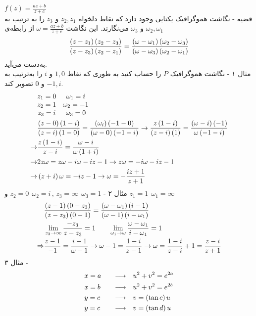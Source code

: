 $f(z)=\frac{az+b}{z+c}$\\
قضیه - نگاشت هموگرافیک یکتایی وجود دارد که نقاط دلخواه
$z_2,z_1$
و
$z_3$
را به ترتیب به
$\omega_2,\omega_1$
و
$\omega_3$
می‌نگارند. این نگاشت
$\omega=\frac{az+b}{z+c}$
از رابطه‌ی
\[
\frac{\left(z-z_1\right)\left(z_2-z_3\right)}{\left(z-z_3\right)\left(z_2-z_1\right)}=
\frac{\left(\omega-\omega_1\right)\left(\omega_2-\omega_3\right)}{\left(\omega-\omega_3\right)\left(\omega_2-\omega_1\right)}
\]
به‌دست می‌آید.\\
مثال ۱ - نگاشت هموگرافیک
$P$
را حساب کنید به طوری که نقاط
$1,0$
و
$i$
را به‌ترتیب به
$-1,i$
و
$0$
تصویر کند.
\[\begin{aligned}
	&\begin{matrix}
		z_1=0 & \omega_1=i
		\\
		z_2=1 & \omega_2=-1
		\\
		z_3=i & \omega_3=0
	\end{matrix}
	\\ &
	\frac{\left(z-0\right)\left(1-i\right)}{\left(z-i\right)\left(1-0\right)}=\frac{\left(\omega_i\right)\left(-1-0\right)}{\left(\omega-0\right)\left(-1-i\right)}\rightarrow\frac{z\left(1-i\right)}{\left(z-i\right)\left(1\right)}=\frac{\left(\omega-i\right)\left(-1\right)}{\omega\left(-1-i\right)}
	\\
	\rightarrow & \frac{z\left(1-i\right)}{z-i}=\frac{\omega-i}{\omega\left(1+i\right)}
	\\ \rightarrow & 2z\omega=z\omega-i\omega-iz-1\rightarrow z\omega=-i\omega-iz-1
	\\ \rightarrow &
	\left(z+i\right)\omega=-iz-1\rightarrow\omega=-\frac{iz+1}{z+1}
\end{aligned}\]
مثال ۲ - 
$z_2=0\ \ \omega_2=i \, , \, z_3=\infty \ \ \omega_3=1$
و
$z_1=1\ \ \omega_1=\infty$
\[\begin{aligned}
	&
	\frac{\left(z-1\right)\left(0-z_3\right)}{\left(z-z_3\right)\left(0-1\right)}=\frac{\left(\omega-\omega_1\right)\left(i-1\right)}{\left(\omega-1\right)\left(i-\omega_1\right)}
	\\
	&
	\lim_{z_3\to\infty} \frac{-z_3}{z-z_3}=1 \qquad
	\lim_{\omega_1\to\omega}\frac{\omega-\omega_1}{i-\omega_1}=1
	\\
	\Rightarrow &
	\frac{z-1}{-1}=\frac{i-1}{\omega-1}\rightarrow\omega-1=\frac{1-i}{z-1}\rightarrow \omega=\frac{1-i}{z-i}+1=\frac{z-i}{z+1}
\end{aligned}\]
مثال ۳ -\\
\[\begin{aligned}
	& x=a \quad &\longrightarrow \quad & u^2+v^2=e^{2a}
	\\ &
	x=b \quad &\longrightarrow \quad & u^2+v^2=e^{2b}
	\\ &
	y=c \quad &\longrightarrow \quad & v=\left(\tan c\right)u
	\\ &
	y=c \quad &\longrightarrow \quad & v=\left(\tan d\right)u
\end{aligned}\]
